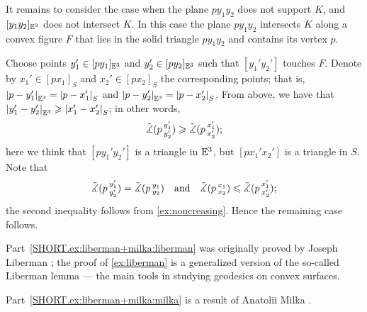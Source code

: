 It remains to consider the case when the plane $py_1y_2$ does not support $K$,
and $[y_1y_2]_{\mathbb{E}^3}$ does not intersect $K$.
In this case the plane $py_1y_2$ intersects $K$ along a convex figure $F$ that lies in the solid triangle 
$py_1y_2$ and contains its vertex $p$.

Choose points $y_1'\in [py_1]_{\mathbb{E}^3}$ and $y_2'\in [py_2]_{\mathbb{E}^3}$ such that $[y_1'y_2']$ touches $F$.
Denote by $x_1'\in [px_1]_{S}$ and $x_2'\in [px_2]_{S}$ the corresponding points;
that is, $\dist{p}{y_1'}{\EE^3}=\dist{p}{x_1'}S$ and $\dist{p}{y_2'}{\EE^3}=\dist{p}{x_2'}S$.
From above, we have that $\dist{y_1'}{y_2'}{\EE^3}\ge\dist{x_1'}{x_2'}S$;
in other words, 
\[\tilde\measuredangle(p\,{}^{y_1'}_{y_2'})\geqslant \tilde\measuredangle(p\,{}^{x_1'}_{x_2'});\]
here we think that $[p{y_1'}{y_2'}]$ is a triangle in $\mathbb{E}^3$, but $[p{x_1'}{x_2'}]$ is a triangle in $S$.
Note that 
\[\tilde\measuredangle(p\,{}^{y_1'}_{y_2'})=\tilde\measuredangle(p\,{}^{y_1}_{y_2})
\quad\text{and}\quad
\tilde\measuredangle(p\,{}^{x_1}_{x_2})\leqslant \tilde\measuredangle(p\,{}^{x_1'}_{x_2'});
\]
the second inequality follows from \ref{ex:noncreasing}.
Hence the remaining case follows.

 Part~\ref{SHORT.ex:liberman+milka:liberman} was originally proved by Joseph Liberman \cite{liberman}; the proof of \ref{ex:liberman} is a generalized version of the so-called Liberman lemma --- the main tools in studying geodesics on convex surfaces.

Part~\ref{SHORT.ex:liberman+milka:milka} is a result of Anatolii Milka \cite[Theorem 2]{milka1982}.

